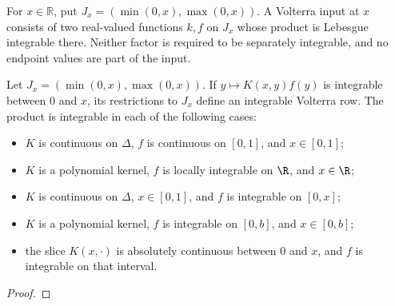 \begin{supporting}
\begin{definition}
\label{def:volterra-integral-input}
\leanok
For $x\in\mathbb R$, put $J_x=(\min(0,x),\max(0,x))$.
A Volterra input at $x$ consists of two real-valued functions $k,f$ on $J_x$
whose product is Lebesgue integrable there. Neither factor is required to be
separately integrable, and no endpoint values are part of the input.
\end{definition}

\begin{theorem}
\label{thm:volterra-integral-input}
\leanok
Let $J_x=(\min(0,x),\max(0,x))$.
If $y\mapsto K(x,y)f(y)$ is integrable between $0$ and $x$, its restrictions
to $J_x$ define an integrable Volterra row.
The product is integrable in each of the following cases:
\begin{itemize}
\item $K$ is continuous on $\Delta$, $f$ is continuous on $[0,1]$, and $x\in[0,1]$;
\item $K$ is a polynomial kernel, $f$ is locally integrable on $\R$, and $x\in\R$;
\item $K$ is continuous on $\Delta$, $x\in[0,1]$, and $f$ is integrable on $[0,x]$;
\item $K$ is a polynomial kernel, $f$ is integrable on $[0,b]$, and $x\in[0,b]$;
\item the slice $K(x,\cdot)$ is absolutely continuous between $0$ and $x$,
and $f$ is integrable on that interval.
\end{itemize}
\end{theorem}
\begin{proof}
\leanok
\end{proof}
\end{supporting}


